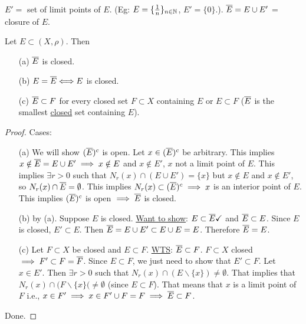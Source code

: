 \documentclass[]{article}
\begin{document}
\begin{recall}
	$E' = $ set of limit points of $E$. (Eg: $E = \{\frac{1}{n}\}_{n\in\mathbb{N}}$, $E' = \{0\}$.). $\overline{E} = E\cup E'$ = closure of $E$.
\end{recall}
\begin{theorem}
	Let $E\subset(X,\rho)$. Then
	\begin{enumerate}
		\item[(a)] $\overline{E}$ is closed.
		\item[(b)] $E = \overline{E} \Longleftrightarrow E$ is closed.
		\item[(c)] $\overline{E}\subset F$ for every closed set $F\subset X$ containing $E$ or $E\subset F$ ($\overline{E}$ is the smallest \ul{closed} set containing $E$).
	\end{enumerate}
\end{theorem}
\begin{proof}
	Cases:
	\begin{enumerate}
		\item[(a)] We will show $(\overline{E})^c$ is open. Let $x\in (\overline{E})^c$ be arbitrary. 
			This implies $x\notin \overline{E} = E\cup E' \implies x\notin E$ and $x\notin E'$, $x$ not a limit point of $E$.
			This implies $\exists r>0$ such that $N_r(x)\cap (E\cup E') = \{x\}$ but $x\notin E$ and $x\notin E'$, so $N_r(x)\cap \overline{E} = \emptyset$.
			This implies $N_r(x)\subset (\overline{E})^c \implies x$ is an interior point of $E$. This implies $(\overline{E})^c$ is open $\implies \overline{E}$ is closed.
		\item[(b)] \say{$\implies$} by (a).
			\say{$\Lla$} Suppose $E$ is closed.
			\ul{Want to show}: $E\subset \overline{E}\checkmark$ and $\overline{E}\subset E$.
			Since $E$ is closed, $E'\subset E$. Then $\overline{E} = E\cup E'\subset E\cup E = E$. Therefore $\overline{E} = E$.
		\item[(c)] Let $F\subset X$ be closed and $E\subset F$.
			\ul{WTS}: $\overline{E} \subset F$.
			$F\subset X$ closed $\implies F'\subset F = \overline{F}$. Since $E\subset F$, we just need to show that $E'\subset F$.
			Let $x\in E'$. Then $\exists r>0$ such that $N_r(x)\cap (E\backslash\{x\})\neq \emptyset$.
			That implies that $N_r(x)\cap(F\backslash\{x\}(\neq \emptyset$ (since $E\subset F$).
			That means that $x$ is a limit point of $F$ i.e., $x\in F' \implies x\in F'\cup F = F \implies \overline{E} \subset F$.
	\end{enumerate}
	Done.
\end{proof}
\end{document}
